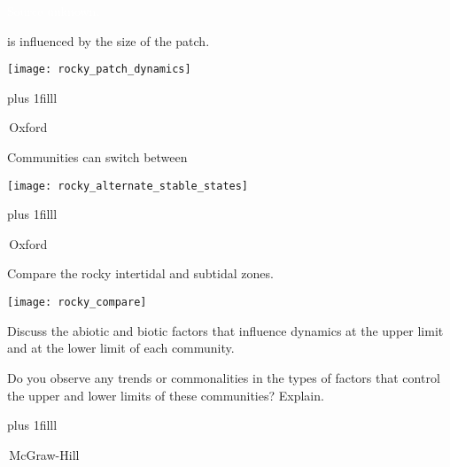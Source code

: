 \documentclass[t]{beamer}
\begin{document}
{
\begin{frame}[b]{}
\tiny\hfill\textcolor{white}{Source unknown.}
\end{frame}
}

\begin{frame}[t]{ is influenced by the size of the patch.}

	\vspace*{-\baselineskip}

	\begin{center}
		\texttt{[image: rocky\_patch\_dynamics]} 
	\end{center}


\vskip0pt plus 1filll

\hfill\tiny\textcopyright\,Oxford

\end{frame}


\begin{frame}[t]{Communities can switch between }

	\vspace*{-\baselineskip}

	\begin{center}
		\texttt{[image: rocky\_alternate\_stable\_states]} 
	\end{center}


\vskip0pt plus 1filll

\hfill\tiny\textcopyright\,Oxford

\end{frame}



\begin{frame}[t]{Compare the rocky intertidal and subtidal zones.}

\vspace*{-\baselineskip}

\begin{multicols}{2}

	\vspace*{-\baselineskip}
	\begin{center}
		\texttt{[image: rocky\_compare]}
	\end{center}

\columnbreak

	\hangpara Discuss the abiotic and biotic factors that influence dynamics at the upper limit and at the lower limit of each community. 
	

	\hangpara Do you observe any trends or commonalities in the types of factors that control the upper and lower limits of these communities? Explain.

\end{multicols}

	\vskip0pt plus 1filll

	\tiny\textcopyright\,McGraw-Hill

\end{frame}
\end{document}

